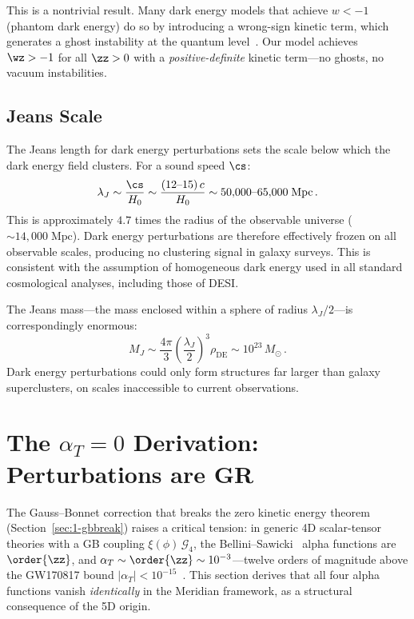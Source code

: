 This is a nontrivial result. Many dark energy models that achieve $w < -1$ (phantom dark energy) do so by introducing a wrong-sign kinetic term, which generates a ghost instability at the quantum level~\cite{ch1:carroll-phantom}. Our model achieves $\wz > -1$ for all $\zz > 0$ with a \emph{positive-definite} kinetic term---no ghosts, no vacuum instabilities.

\subsection{Jeans Scale}
\label{sec:1-jeans}

The Jeans length for dark energy perturbations sets the scale below which the dark energy field clusters. For a sound speed $\cs$:
\begin{equation}
\label{eq:1-jeans-length}
\lambda_J \sim \frac{\cs}{H_0} \sim \frac{(12\text{--}15)\,c}{H_0} \sim 50{,}000\text{--}65{,}000\;\mathrm{Mpc}\,.
\end{equation}
This is approximately $4.7$ times the radius of the observable universe ($\sim 14{,}000\;\mathrm{Mpc}$). Dark energy perturbations are therefore effectively frozen on all observable scales, producing no clustering signal in galaxy surveys. This is consistent with the assumption of homogeneous dark energy used in all standard cosmological analyses, including those of DESI.

The Jeans mass---the mass enclosed within a sphere of radius $\lambda_J/2$---is correspondingly enormous:
\begin{equation}
\label{eq:1-jeans-mass}
M_J \sim \frac{4\pi}{3}\left(\frac{\lambda_J}{2}\right)^{\!3}\!\rho_{\mathrm{DE}} \sim 10^{23}\, M_\odot\,.
\end{equation}
Dark energy perturbations could only form structures far larger than galaxy superclusters, on scales inaccessible to current observations.


\section{The \texorpdfstring{$\alpha_T = 0$}{alphaT = 0} Derivation: Perturbations are GR}
\label{sec:1-alphaT}

The Gauss--Bonnet correction that breaks the zero kinetic energy theorem (Section~\ref{sec:1-gbbreak}) raises a critical tension: in generic 4D scalar-tensor theories with a GB coupling $\xi(\phi)\,\mathcal{G}_4$, the Bellini--Sawicki~\cite{ch1:bellini-sawicki} alpha functions are $\order{\zz}$, and $\alpha_T \sim \order{\zz} \sim 10^{-3}$---twelve orders of magnitude above the GW170817 bound $|\alpha_T| < 10^{-15}$~\cite{ch1:gw170817}. This section derives that all four alpha functions vanish \emph{identically} in the Meridian framework, as a structural consequence of the 5D origin.

